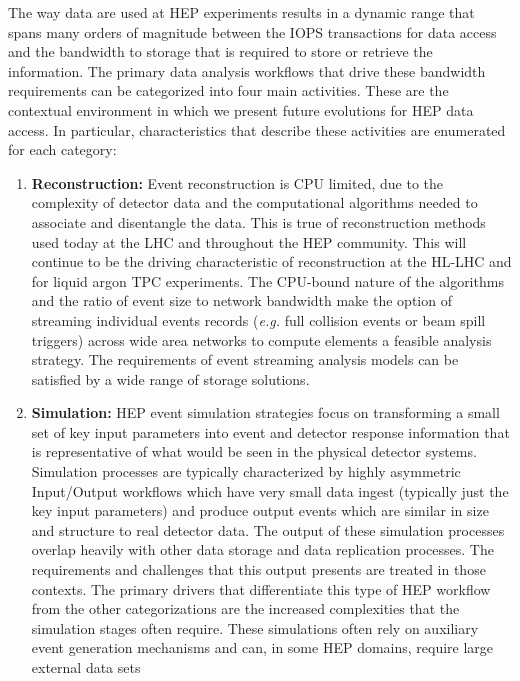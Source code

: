 \documentclass[12pt,a4paper]{article}
\begin{document}
The way data are used at HEP experiments results in a dynamic range that
spans many orders of magnitude between the IOPS transactions for data
access and the bandwidth to storage that is required to store or
retrieve the information. The primary data analysis workflows that drive
these bandwidth requirements can be categorized into four main
activities. These are the contextual environment in which we present
future evolutions for HEP data access. In particular, characteristics
that describe these activities are enumerated for each category:

\begin{enumerate}
\def\labelenumi{\arabic{enumi})}
\item \textbf{Reconstruction:} Event reconstruction is CPU limited, due to
  the complexity of detector data and the computational algorithms
  needed to associate and disentangle the data. This is true of
  reconstruction methods used today at the LHC and throughout the HEP
  community. This will continue to be the driving characteristic of
  reconstruction at the HL-LHC and for liquid argon TPC experiments. The
  CPU-bound nature of the algorithms and the ratio of event size to
  network bandwidth make the option of streaming individual events
  records (\emph{e.g.} full collision events or beam spill triggers)
  across wide area networks to compute elements a feasible analysis
  strategy. The requirements of event streaming analysis models can be
  satisfied by a wide range of storage solutions.
\item \textbf{Simulation:} HEP event simulation strategies focus on
  transforming a small set of key input parameters into event and
  detector response information that is representative of what would be
  seen in the physical detector systems. Simulation processes are
  typically characterized by highly asymmetric Input/Output workflows
  which have very small data ingest (typically just the key input
  parameters) and produce output events which are similar in size and
  structure to real detector data. The output of these simulation
  processes overlap heavily with other data storage and data replication
  processes. The requirements and challenges that this output presents
  are treated in those contexts. The primary drivers that differentiate
  this type of HEP workflow from the other categorizations are the
  increased complexities that the simulation stages often require. These
  simulations often rely on auxiliary event generation mechanisms and
  can, in some HEP domains, require large external data sets

\end{enumerate}
\end{document}
